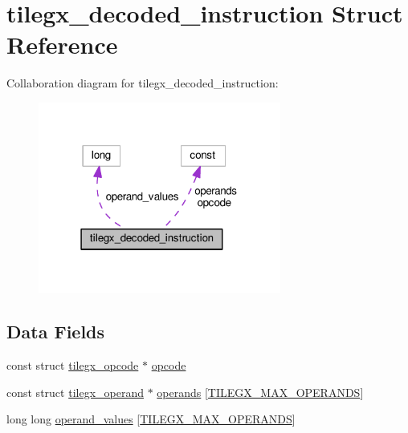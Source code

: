 \hypertarget{structtilegx__decoded__instruction}{}\section{tilegx\+\_\+decoded\+\_\+instruction Struct Reference}
\label{structtilegx__decoded__instruction}


Collaboration diagram for tilegx\+\_\+decoded\+\_\+instruction\+:
\nopagebreak
\begin{figure}[H]
\begin{center}
\leavevmode
\includegraphics[width=226pt]{structtilegx__decoded__instruction__coll__graph}
\end{center}
\end{figure}
\subsection*{Data Fields}
\begin{DoxyCompactItemize}
\item 
const struct \hyperlink{structtilegx__opcode}{tilegx\+\_\+opcode} $\ast$ \hyperlink{structtilegx__decoded__instruction_a28eaaa8cf2f9ac76bda38bda76cea24f}{opcode}
\item 
const struct \hyperlink{structtilegx__operand}{tilegx\+\_\+operand} $\ast$ \hyperlink{structtilegx__decoded__instruction_a6685678267fe496c9ee0df0c5319101d}{operands} \mbox{[}\hyperlink{sljitNativeTILEGX-encoder_8c_aa156d1cebb38c8a65846c4d9c006012aa23db5f91514048ae08bc5e8c18230fc2}{T\+I\+L\+E\+G\+X\+\_\+\+M\+A\+X\+\_\+\+O\+P\+E\+R\+A\+N\+DS}\mbox{]}
\item 
long long \hyperlink{structtilegx__decoded__instruction_aeeea6dd405b6d3370ac804b2ef4a0c44}{operand\+\_\+values} \mbox{[}\hyperlink{sljitNativeTILEGX-encoder_8c_aa156d1cebb38c8a65846c4d9c006012aa23db5f91514048ae08bc5e8c18230fc2}{T\+I\+L\+E\+G\+X\+\_\+\+M\+A\+X\+\_\+\+O\+P\+E\+R\+A\+N\+DS}\mbox{]}
\end{DoxyCompactItemize}


